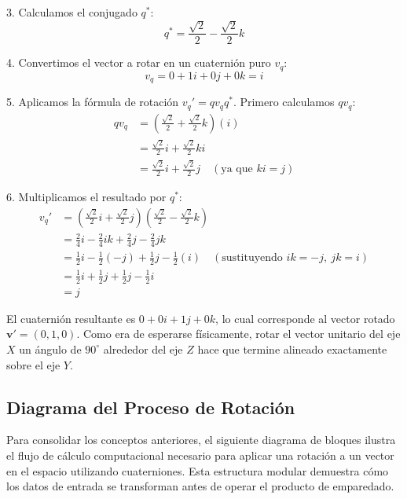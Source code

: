 3. Calculamos el conjugado $q^*$:
   \begin{equation*}
       q^* = \frac{\sqrt{2}}{2} - \frac{\sqrt{2}}{2}k
   \end{equation*}

4. Convertimos el vector a rotar en un cuaternión puro $v_q$:
   \begin{equation*}
       v_q = 0 + 1i + 0j + 0k = i
   \end{equation*}

5. Aplicamos la fórmula de rotación $v_q' = q v_q q^*$. Primero calculamos $q v_q$:
   \begin{align*}
       q v_q &= \left( \frac{\sqrt{2}}{2} + \frac{\sqrt{2}}{2}k \right) (i) \\
       &= \frac{\sqrt{2}}{2}i + \frac{\sqrt{2}}{2}ki \\
       &= \frac{\sqrt{2}}{2}i + \frac{\sqrt{2}}{2}j \quad (\text{ya que } ki = j)
   \end{align*}

6. Multiplicamos el resultado por $q^*$:
   \begin{align*}
       v_q' &= \left( \frac{\sqrt{2}}{2}i + \frac{\sqrt{2}}{2}j \right) \left( \frac{\sqrt{2}}{2} - \frac{\sqrt{2}}{2}k \right) \\
       &= \frac{2}{4}i - \frac{2}{4}ik + \frac{2}{4}j - \frac{2}{4}jk \\
       &= \frac{1}{2}i - \frac{1}{2}(-j) + \frac{1}{2}j - \frac{1}{2}(i) \quad (\text{sustituyendo } ik = -j, \: jk = i) \\
       &= \frac{1}{2}i + \frac{1}{2}j + \frac{1}{2}j - \frac{1}{2}i \\
       &= j
   \end{align*}

El cuaternión resultante es $0 + 0i + 1j + 0k$, lo cual corresponde al vector rotado $\mathbf{v}' = (0, 1, 0)$. Como era de esperarse físicamente, rotar el vector unitario del eje $X$ un ángulo de $90^\circ$ alrededor del eje $Z$ hace que termine alineado exactamente sobre el eje $Y$.


\subsection{Diagrama del Proceso de Rotación}
Para consolidar los conceptos anteriores, el siguiente diagrama de bloques ilustra el flujo de cálculo computacional necesario para aplicar una rotación a un vector en el espacio utilizando cuaterniones. Esta estructura modular demuestra cómo los datos de entrada se transforman antes de operar el producto de emparedado.

